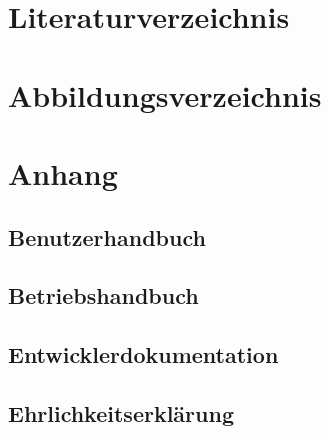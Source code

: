 
\section {Literaturverzeichnis}

\section {Abbildungsverzeichnis}

\section{Anhang}
    \subsection{Benutzerhandbuch}
    \subsection{Betriebshandbuch}
    \subsection{Entwicklerdokumentation}
    \subsection{Ehrlichkeitserklärung}